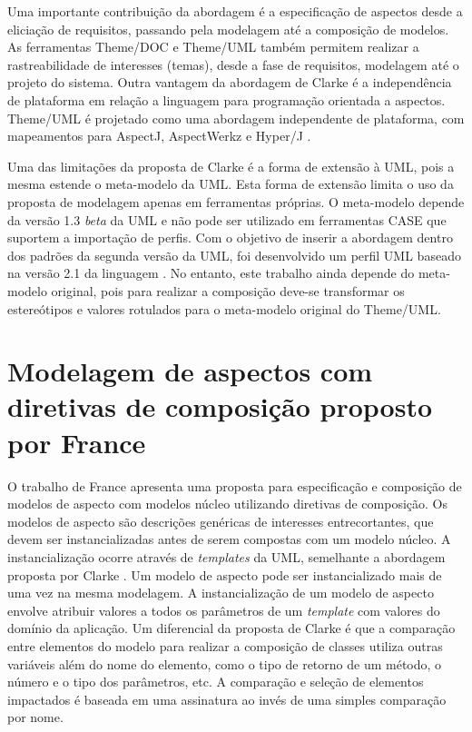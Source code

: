 Uma importante contribuição da abordagem é a especificação de aspectos desde a eliciação de requisitos, passando pela modelagem até a composição de
modelos. As ferramentas Theme/DOC e Theme/UML também permitem realizar a rastreabilidade de interesses (temas), desde a fase de requisitos, modelagem 
até o projeto do sistema. Outra vantagem da abordagem de Clarke é a independência de plataforma em relação a linguagem para programação orientada a
aspectos. Theme/UML é projetado como uma abordagem independente de plataforma, com mapeamentos para AspectJ, AspectWerkz \cite{aspectwerkz} e Hyper/J
\cite{hyperj}.

Uma das limitações da proposta de Clarke é a forma de extensão à UML, pois a mesma estende o meta-modelo da UML. Esta forma de extensão limita o uso
da proposta de modelagem apenas em ferramentas próprias. O meta-modelo depende da versão 1.3 \textit{beta} da UML e não pode ser utilizado em
ferramentas CASE que suportem a importação de perfis. Com o objetivo de inserir a abordagem dentro dos padrões da segunda versão da UML, foi
desenvolvido um perfil UML baseado na versão 2.1 da linguagem \cite{Carton:2009:MT:1692821.1692829}. No entanto, este trabalho ainda depende do meta-modelo 
original, pois para realizar a composição deve-se transformar os estereótipos e valores rotulados para o meta-modelo original do Theme/UML. 

\section{Modelagem de aspectos com diretivas de composição proposto por France}

O trabalho de France \cite{france:06} \cite{FranceReddy} apresenta uma proposta para especificação e composição de modelos de aspecto com modelos
núcleo utilizando diretivas de composição. Os modelos de aspecto são descrições genéricas de interesses entrecortantes, que devem ser instancializadas antes de serem
compostas com um modelo núcleo. A instancialização ocorre através de \textit{templates} da UML, semelhante a abordagem proposta por Clarke
\cite{clarke:04}. Um modelo de aspecto pode ser instancializado mais de uma vez na mesma modelagem. A instancialização de um modelo de aspecto envolve 
atribuir valores a todos os parâmetros de um \textit{template} com valores do domínio da aplicação. Um diferencial da proposta de Clarke é que a
comparação entre elementos do modelo para realizar a composição de classes utiliza outras variáveis além do nome do elemento, como o tipo de retorno
de um método, o número e o tipo dos parâmetros, etc. A comparação e seleção de elementos impactados é baseada em uma assinatura ao invés de uma
simples comparação por nome.

